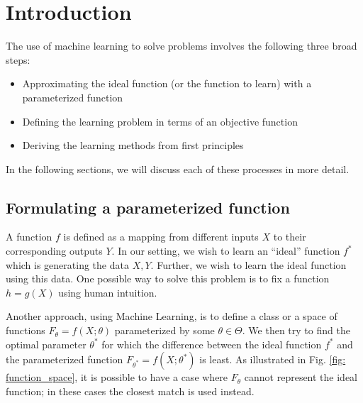 \documentclass[twoside]{article}
\begin{document}
\section{Introduction}

The use of machine learning to solve problems involves the following three broad steps:
\begin{itemize}
\item Approximating the ideal function (or the function to learn) with a parameterized function
\item Defining the learning problem in terms of an objective function
\item Deriving the learning methods from first principles
\end{itemize}

In the following sections, we will discuss each of these processes in more detail.

\subsection{Formulating a parameterized function}
A function $f$ is defined as a mapping from different inputs $X$ to their corresponding outputs $Y$. In our setting, we wish to learn an ``ideal'' function $f^*$ which is generating the data $X, Y$. Further, we wish to learn the ideal function using this data. One possible way to solve this problem is to fix a function $h = g(X)$ using human intuition.

Another approach, using Machine Learning, is to define a class or a space of functions $F_\theta = f(X; \theta)$ parameterized by some $\theta \in \Theta$. We then try to find the optimal parameter $\theta^*$ for which the difference between the ideal function $f^*$ and the parameterized function $F_{\theta^*} = f(X; \theta^*)$ is least. As illustrated in Fig. \ref{fig: function_space}, it is possible to have a case where $F_\theta$ cannot represent the ideal function; in these cases the closest match is used instead.
\end{document}
